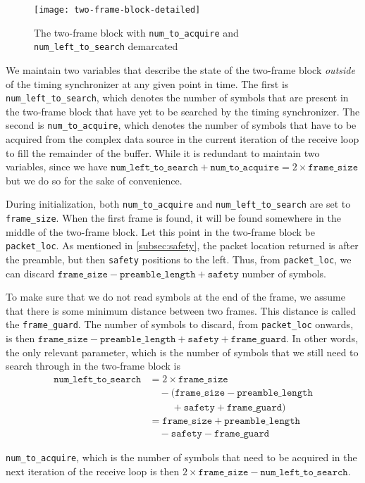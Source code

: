 \begin{figure}[h]
	\centering
	\texttt{[image: two-frame-block-detailed]}
	\caption{The two-frame block with \texttt{num\_to\_acquire} and
	         \texttt{num\_left\_to\_search} demarcated}
	\label{fig:two-frame-block-detailed}
\end{figure}

\begin{sloppypar}
We maintain two variables that describe the state of the two-frame block
\emph{outside} of the timing synchronizer at any given point in time. The first
is \texttt{num\_left\_to\_search}, which denotes the number of symbols that
are present in the two-frame block that have yet to be searched by the timing
synchronizer. The second is \verb+num_to_acquire+, which denotes the number of
symbols that have to be acquired from the complex data source in the current
iteration of the receive loop to fill the remainder of the buffer. While it is
redundant to maintain two variables, since we have
$\texttt{num\_left\_to\_search} + \texttt{num\_to\_acquire} = 2 \times
\texttt{frame\_size}$ but we do so for the sake of convenience.
\end{sloppypar}

During initialization, both \verb+num_to_acquire+ and \verb+num_left_to_search+
are set to \verb+frame_size+. When the first frame is found, it will be found
somewhere in the middle of the two-frame block. Let this point in the two-frame
block be \verb+packet_loc+. As mentioned in \ref{subsec:safety}, the packet
location returned is after the preamble, but then \verb+safety+ positions to
the left. Thus, from \verb+packet_loc+, we can discard $\texttt{frame\_size}
- \texttt{preamble\_length} + \texttt{safety}$ number of symbols.

To make sure that we do not read symbols at the end of the frame, we assume
that there is some minimum distance between two frames. This distance is called
the \verb+frame_guard+. The number of symbols to discard, from
\verb+packet_loc+ onwards, is then $\texttt{frame\_size}
- \texttt{preamble\_length} + \texttt{safety} + \texttt{frame\_guard}$. In
other words, the only relevant parameter, which is the number of symbols that
we still need to search through in the two-frame block is
\begin{equation}
	\begin{split}
		\texttt{num\_left\_to\_search} &= 2 \times \texttt{frame\_size} \\
		                               & \quad - (\texttt{frame\_size} - \texttt{preamble\_length} \\
		                               & \quad \quad \; + \texttt{safety} + \texttt{frame\_guard}) \\
		                               &= \texttt{frame\_size} + \texttt{preamble\_length} \\
		                               & \quad - \texttt{safety} - \texttt{frame\_guard}
	\end{split}
\end{equation}

\verb+num_to_acquire+, which is the number of symbols that need to be acquired
in the next iteration of the receive loop is then
$2 \times \texttt{frame\_size} - \texttt{num\_left\_to\_search}$.
